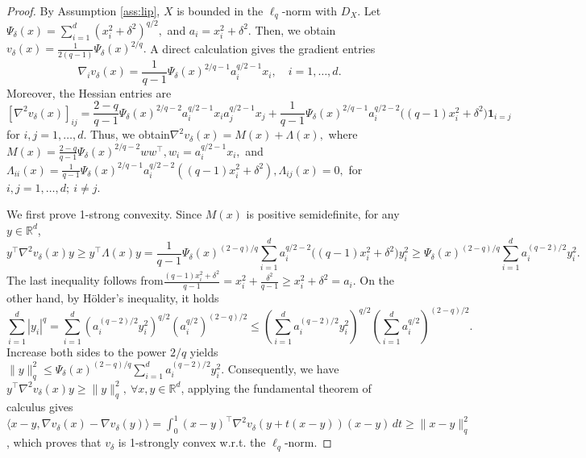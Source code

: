 \documentclass[10pt,a4paper]{amsart}
\begin{document}
\begin{proof}
By Assumption \ref{ass:lip}, $X$ is bounded in the $\ell_q$-norm with $D_X$.
Let
\( \Psi_\delta(x)=\sum_{i=1}^d (x_i^2+\delta^2)^{q/2},\) and \(a_i=x_i^2+\delta^2 .\)
Then, we obtain
\(
    v_\delta(x)=\frac{1}{2(q-1)}\Psi_\delta(x)^{2/q}.
\) 
A direct calculation gives the gradient entries
\[
    \nabla_i v_\delta(x)=\frac{1}{q-1}\Psi_\delta(x)^{2/q-1}a_i^{q/2-1}x_i ,\quad i=1,\ldots,d.
\]
Moreover, the Hessian entries are
\[
    [\nabla^2 v_\delta(x)]_{ij}
    =\frac{2-q}{q-1}\Psi_\delta(x)^{2/q-2}a_i^{q/2-1}x_ia_j^{q/2-1}x_j                +\frac{1}{q-1}\Psi_\delta(x)^{2/q-1}a_i^{q/2-2}\big((q-1)x_i^2+\delta^2\big)\mathbf 1_{{i=j}} 
\]
for $i,j=1,\ldots,d.$ 
Thus, we obtain\(\nabla^2 v_\delta(x)=M(x)+\Lambda(x),\) where \(M(x)=\frac{2-q}{q-1}\Psi_\delta(x)^{2/q-2}ww^\top, w_i=a_i^{q/2-1}x_i,\) and \(\Lambda_{ii}(x)=\frac{1}{q-1}\Psi_\delta(x)^{2/q-1}a_i^{q/2-2}((q-1)x_i^2+\delta^2), \Lambda_{ij}(x)=0, \) for \(i,j=1,\ldots,d;\ i\ne j .\)

We first prove 1-strong convexity. Since $M(x)$ is positive semidefinite, for any $y\in\mathbb R^d$,
\[
    y^\top \nabla^2 v_\delta(x)y
    \ge
    y^\top \Lambda(x)y     =
    \frac{1}{q-1}
\Psi_\delta(x)^{(2-q)/q}
    \sum_{i=1}^d
    a_i^{q/2-2}
    \big((q-1)x_i^2+\delta^2\big)y_i^2    
\ge\Psi_\delta(x)^{(2-q)/q}
    \sum_{i=1}^d
    a_i^{(q-2)/2}y_i^2 .
\]
The last inequality follows from\(\frac{(q-1)x_i^2+\delta^2}{q-1}=x_i^2+\frac{\delta^2}{q-1}\ge x_i^2+\delta^2=a_i .\) On the other hand, by H\"older's inequality, it holds
\[
    \sum_{i=1}^d |y_i|^q
    =
    \sum_{i=1}^d
    (a_i^{(q-2)/2}y_i^2)^{q/2}
    (a_i^{q/2})^{(2-q)/2}       
    \le
    (\sum_{i=1}^d a_i^{(q-2)/2}y_i^2)^{q/2}
    (\sum_{i=1}^d a_i^{q/2})^{(2-q)/2}.
\]
Increase both sides to the power $2/q$ yields \(\|y\|_q^2\le\Psi_\delta(x)^{(2-q)/q}\sum_{i=1}^d a_i^{(q-2)/2}y_i^2 .\) Consequently, we have \(y^\top \nabla^2 v_\delta(x)y\ge\|y\|_q^2 ,\ \forall x,y\in\mathbb R^d\), applying the fundamental theorem of calculus gives
\(\langle x-y,\nabla v_\delta(x)-\nabla v_\delta(y)\rangle=\int_0^1(x-y)^\top\nabla^2v_\delta(y+t(x-y))(x-y)\,dt\geq
\|x-y\|_q^2\), which proves that $v_\delta$ is 1-strongly convex w.r.t. the $\ell_q$-norm.


\end{proof}
\end{document}

